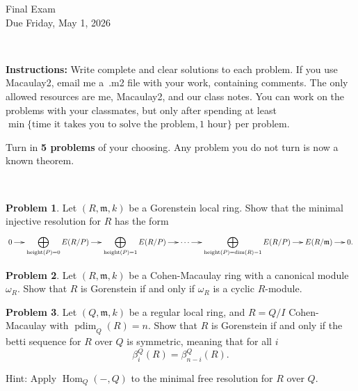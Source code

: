 \documentclass[11pt]{article}
\title{}
\date{\vspace{-0.5in}}
\DeclareMathOperator{\height}{height}
\DeclareMathOperator{\Hom}{Hom}
\newcommand{\m}{\mathfrak{m}}
\DeclareMathOperator{\pdim}{pdim}
\theoremstyle{definition}
\newtheorem{problem}{Problem}
\begin{document}
\thispagestyle{fancy}
\pagestyle{fancy}

\vspace{3em}

\begin{center}
	{\LARGE Final Exam \\}
	Due Friday, May 1, 2026
\end{center}

\

\noindent
{\bf Instructions:}
Write complete and clear solutions to each problem. If you use Macaulay2, email me a~.m2 file with your work, containing comments.
The only allowed resources are me, Macaulay2, and our class notes.
You can work on the problems with your classmates, but only after spending at least $\min \lbrace \text{time it takes you to solve the problem}, \text{1 hour} \rbrace$ per problem. 


\vspace{1em}


\noindent
Turn in {\bf 5 problems} of your choosing. Any problem you do not turn is now a known theorem.

\



\begin{problem}
	Let $(R, \m, k)$ be a Gorenstein local ring. Show that the minimal injective resolution for $R$ has the form
\[ \xymatrix@C=1.3em{
 0 \arrow[r] & \displaystyle\bigoplus_{\height(P) = 0} E(R/P) \arrow[r] & \displaystyle\bigoplus_{\height(P) = 1} E(R/P) \arrow[r] & \cdots \arrow[r] & \displaystyle\bigoplus_{\height(P) = \dim(R)-1} E(R/P) \arrow[r] & E(R/\m) \arrow[r] & 0.
}\]
\end{problem}


\vspace{0.5em}


\begin{problem}
	Let $(R, \m, k)$ be a Cohen-Macaulay ring with a canonical module $\omega_R$. Show that $R$ is Gorenstein if and only if $\omega_R$ is a cyclic $R$-module.
\end{problem}

\vspace{0.5em}

\begin{problem}
Let $(Q, \m, k)$ be a regular local ring, and $R = Q/I$ Cohen-Macaulay with $\pdim_Q(R) = n$.
Show that $R$ is Gorenstein if and only if the betti sequence for $R$ over $Q$ is symmetric, meaning that for all $i$
\[ \beta_i^Q(R) = \beta_{n-i}^Q(R).\]

	\noindent
	Hint: Apply $\Hom_Q(-,Q)$ to the minimal free resolution for $R$ over $Q$.
\end{problem}
\end{document}
